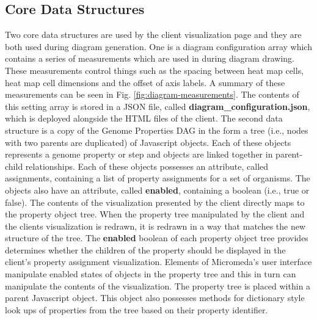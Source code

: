 \subsection{Core Data Structures}

Two core data structures are used by the client visualization page and they are both used during diagram generation. One is a diagram configuration array which contains a series of measurements which are used in during diagram drawing. These measurements control things such as the spacing between heat map cells, heat map cell dimensions and the offset of axis labels. A summary of these measurements can be seen in Fig. \ref{fig:diagram-measurements}. The contents of this setting array is stored in a JSON file, called \textbf{diagram\_configuration.json}, which is deployed alongside the HTML files of the client. The second data structure is a copy of the Genome Properties DAG in the form a tree (i.e., nodes with two parents are duplicated) of Javascript objects. Each of these objects represents a genome property or step and objects are linked together in parent-child relationships. Each of these objects possesses an attribute, called assignments, containing a list of property assignments for a set of organisms. The objects also have an attribute, called \textbf{enabled}, containing a boolean (i.e., true or false). The contents of the visualization presented by the client directly maps to the property object tree. When the property tree manipulated by the client and the clients visualization is redrawn, it is redrawn in a way that matches the new structure of the tree. The \textbf{enabled} boolean of each property object tree provides determines whether the children of the property should be displayed in the client's property assignment visualization. Elements of Micromeda's user interface manipulate enabled states of objects in the property tree and this in turn can manipulate the contents of the visualization. The property tree is placed within a parent Javascript object. This object also possesses methods for dictionary style look ups of properties from the tree based on their property identifier.

